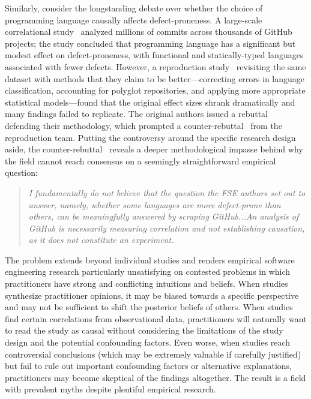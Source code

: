 Similarly, consider the longstanding debate over whether the choice of programming language causally affects defect-proneness. 
A large-scale correlational study~\cite{DBLP:conf/sigsoft/RayPFD14, DBLP:journals/cacm/RayPDF17} analyzed millions of commits across thousands of GitHub projects; the study concluded that programming language has a significant but modest effect on defect-proneness, with functional and statically-typed languages associated with fewer defects.
However, a reproduction study~\cite{DBLP:journals/toplas/BergerHMVV19} revisiting the same dataset with methods that they claim to be better---correcting errors in language classification, accounting for polyglot repositories, and applying more appropriate statistical models---found that the original effect sizes shrank dramatically and many findings failed to replicate. 
The original authors issued a rebuttal~\cite{DBLP:journals/corr/abs-1911-07393} defending their methodology, which prompted a counter-rebuttal~\cite{DBLP:journals/corr/abs-1911-11894} from the reproduction team. 
Putting the controversy around the specific research design aside, the counter-rebuttal~\cite{DBLP:journals/corr/abs-1911-11894} reveals a deeper methodological impasse behind why the field cannot reach consensus on a seemingly straightforward empirical question:
\begin{quote}
\emph{I fundamentally do not believe that the question the FSE authors set out to answer, namely, whether some languages are more defect-prone than others, can be meaningfully answered by scraping GitHub...An analysis of GitHub is necessarily measuring correlation and not establishing causation, as it does not constitute an experiment.}
\end{quote}

The problem extends beyond individual studies and renders empirical software engineering research particularly unsatisfying on contested problems in which practitioners have strong and conflicting intuitions and beliefs.
When studies synthesize practitioner opinions, it may be biased towards a specific perspective and may not be sufficient to shift the posterior beliefs of others.
When studies find certain correlations from observational data, practitioners will naturally want to read the study as causal without considering the limitations of the study design and the potential confounding factors.
Even worse, when studies reach controversial conclusions (which may be extremely valuable if carefully justified) but fail to rule out important confounding factors or alternative explanations, practitioners may become skeptical of the findings altogether. 
The result is a field with prevalent myths despite plentiful empirical research.

